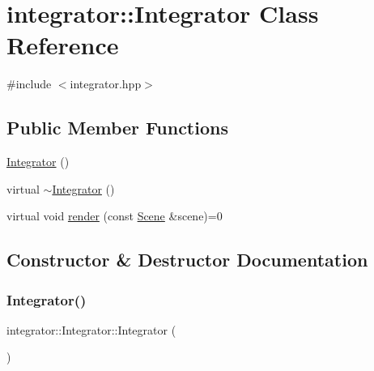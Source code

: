 \hypertarget{classintegrator_1_1Integrator}{}\section{integrator\+::Integrator Class Reference}
\label{classintegrator_1_1Integrator}


{\ttfamily \#include $<$integrator.\+hpp$>$}

\subsection*{Public Member Functions}
\begin{DoxyCompactItemize}
\item 
\mbox{\hyperlink{classintegrator_1_1Integrator_ac41231b0a0ec395b7f6577541d835369}{Integrator}} ()
\item 
virtual \mbox{\hyperlink{classintegrator_1_1Integrator_ae7794a8ad761181a59d6ab314119bf33}{$\sim$\+Integrator}} ()
\item 
virtual void \mbox{\hyperlink{classintegrator_1_1Integrator_a02a7bb9b04ac6f28eb8adb4d48eed770}{render}} (const \mbox{\hyperlink{classScene}{Scene}} \&scene)=0
\end{DoxyCompactItemize}


\subsection{Constructor \& Destructor Documentation}
\mbox{\label{classintegrator_1_1Integrator_ac41231b0a0ec395b7f6577541d835369}} 
\subsubsection{\texorpdfstring{Integrator()}{Integrator()}}
{\footnotesize\ttfamily integrator\+::\+Integrator\+::\+Integrator (\begin{DoxyParamCaption}{ }\end{DoxyParamCaption})\hspace{0.3cm}{\ttfamily [inline]}}

\mbox{\label{classintegrator_1_1Integrator_ae7794a8ad761181a59d6ab314119bf33}} 
